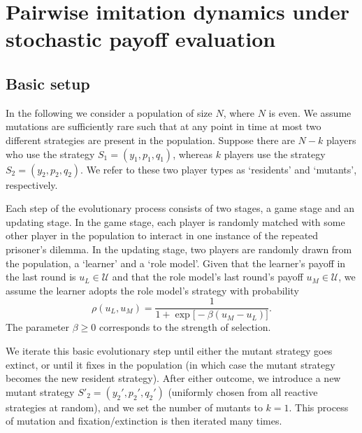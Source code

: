 \documentclass[11pt]{article}
\theoremstyle{plainCl1}
\theoremstyle{plainCl2}
\begin{document}
\section{Pairwise imitation dynamics under stochastic payoff evaluation}

\subsection{Basic setup} \label{Sec:BasicSetup}
In the following we consider a population of size $N$, where $N$ is even. We assume mutations are sufficiently rare such that at any point in time at most two different strategies are present in the population. Suppose there are $N\!-\!k$ players who use the strategy $S_1\!=\!(y_1,p_1,q_1)$, whereas $k$ players use the strategy $S_2\!=\!(y_2,p_2,q_2)$. We refer to these two player types as `residents' and `mutants', respectively. 

Each step of the evolutionary process consists of two stages, a game stage and an updating stage. In the game stage, each player is randomly matched with some other player in the population to interact in one instance of the repeated prisoner's dilemma. 
In the updating stage, two players are randomly drawn from the population, a `learner' and a `role model'. Given that the learner's payoff in the last round is $u_L\!\in\! \mathcal{U}$ and that the role model's last round's payoff $u_M\!\in\! \mathcal{U}$, we assume the learner adopts the role model's strategy with probability 
\begin{equation} \label{Eq:rho}
\rho(u_L, u_M) = \frac{1}{1\!+\!\exp\big[ \!-\!\beta (u_M\!-\!u_L) \big]}. 
\end{equation}
The parameter $\beta\!\ge\!0$ corresponds to the strength of selection.

We iterate this basic evolutionary step until either the mutant strategy goes extinct, or until it fixes in the population (in which case the mutant strategy becomes the new resident strategy). After either outcome, we introduce a new mutant strategy $S'_2\!=\!(y_2',p_2',q_2')$ (uniformly chosen from all reactive strategies at random), and we set the number of mutants to $k\!=\!1$. This process of mutation and fixation/extinction is then iterated many times. 
\end{document}
